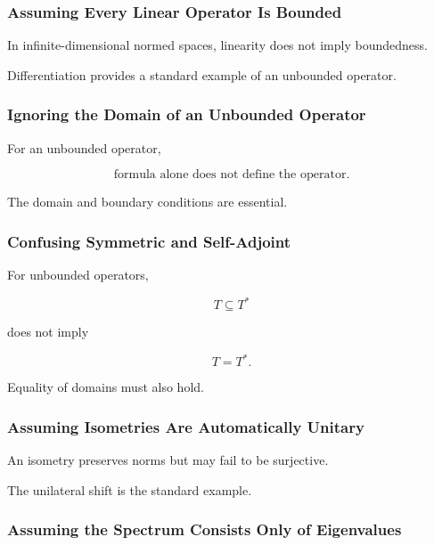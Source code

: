 \subsubsection{Assuming Every Linear Operator Is Bounded}

In infinite-dimensional normed spaces, linearity does not imply
boundedness.

Differentiation provides a standard example of an unbounded operator.

\subsubsection{Ignoring the Domain of an Unbounded Operator}

For an unbounded operator,

\[
\boxed{
\text{formula alone does not define the operator}.
}
\]

The domain and boundary conditions are essential.

\subsubsection{Confusing Symmetric and Self-Adjoint}

For unbounded operators,

\[
\boxed{
T\subseteq T^*
}
\]

does not imply

\[
T=T^*.
\]

Equality of domains must also hold.

\subsubsection{Assuming Isometries Are Automatically Unitary}

An isometry preserves norms but may fail to be surjective.

The unilateral shift is the standard example.

\subsubsection{Assuming the Spectrum Consists Only of Eigenvalues}

